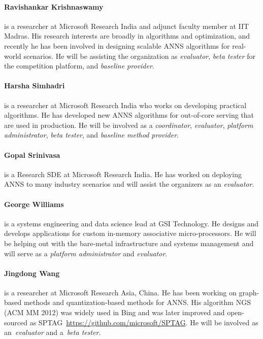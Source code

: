 \paragraph{Ravishankar Krishnaswamy} is a researcher at Microsoft Research India and adjunct faculty member at IIT Madras. His research interests are broadly in algorithms and optimization, and recently he has been involved in designing scalable ANNS algorithms for real-world scenarios. He will be assisting the organization as \emph{evaluator}, \emph{beta tester} for  the competition platform, and \emph{baseline provider}.

\paragraph{Harsha Simhadri} 
is a researcher at Microsoft Research India who works on developing
practical algorithms. He has developed new ANNS algorithms for
out-of-core serving that are used in production.  He will be involved
as a \emph{coordinator}, \emph{evaluator}, \emph{platform
  administrator}, \emph{beta tester}, and \emph{baseline method
  provider}.
  
 \paragraph{Gopal Srinivasa} is a Research SDE at Microsoft Research India. He has worked on deploying ANNS to many industry scenarios and will assist the organizers as an \emph{evaluator}.

\paragraph{George Williams} is a systems engineering and data science lead at GSI Technology. He designs and develops applications for custom in-memory associative micro-processors. He will be helping out with the bare-metal infrastructure and systems management and will serve as a \emph{platform administrator} and \emph{evaluator}.

\paragraph{Jingdong Wang}
is a researcher at Microsoft Research Asia, China. He has been working on graph-based methods and quantization-based methods for ANNS. His algorithm NGS (ACM MM 2012) was widely used in Bing and was later improved and open-sourced as SPTAG~\url{https://github.com/microsoft/SPTAG}. 
He will be involved as an~\emph{evaluator} and a~\emph{beta tester}.

